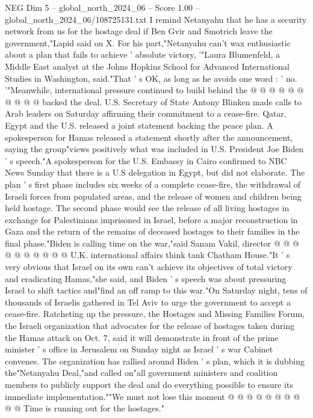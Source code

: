 \begin{textsample}{NEG Dim 5 – global\_north\_2024\_06 – Score 1.00 – global\_north\_2024\_06/108725131.txt}
I remind Netanyahu that he has a security network from us for the hostage deal if Ben Gvir and Smotrich leave the government,"Lapid said on X.
For his part,"Netanyahu can't wax enthusiastic about a plan that fails to achieve ' absolute victory, '"Laura Blumenfeld, a Middle East analyst at the Johns Hopkins School for Advanced International Studies in Washington, said."That ' s OK, as long as he avoids one word : ' no. '"Meanwhile, international pressure continued to build behind the @ @ @ @ @ @ @ @ @ @ backed the deal.
U.S.
Secretary of State Antony Blinken made calls to Arab leaders on Saturday affirming their commitment to a cease-fire.
Qatar, Egypt and the U.S. released a joint statement backing the peace plan.
A spokesperson for Hamas released a statement shortly after the announcement, saying the group"views positively what was included in U.S.
President Joe Biden ' s speech."A spokesperson for the U.S.
Embassy in Cairo confirmed to NBC News Sunday that there is a U.S delegation in Egypt, but did not elaborate.
The plan ' s first phase includes six weeks of a complete cease-fire, the withdrawal of Israeli forces from populated areas, and the release of women and children being held hostage.
The second phase would see the release of all living hostages in exchange for Palestinians imprisoned in Israel, before a major reconstruction in Gaza and the return of the remains of deceased hostages to their families in the final phase."Biden is calling time on the war,"said Sanam Vakil, director @ @ @ @ @ @ @ @ @ @ U.K. international affairs think tank Chatham House."It ' s very obvious that Israel on its own can't achieve its objectives of total victory and eradicating Hamas,"she said, and Biden ' s speech was about pressuring Israel to shift tactics and"find an off ramp to this war."On Saturday night, tens of thousands of Israelis gathered in Tel Aviv to urge the government to accept a cease-fire.
Ratcheting up the pressure, the Hostages and Missing Families Forum, the Israeli organization that advocates for the release of hostages taken during the Hamas attack on Oct. 7, said it will demonstrate in front of the prime minister ' s office in Jerusalem on Sunday night as Israel ' s war Cabinet convenes.
The organization has rallied around Biden ' s plan, which it is dubbing the"Netanyahu Deal,"and called on"all government ministers and coalition members to publicly support the deal and do everything possible to ensure its immediate implementation.""We must not lose this moment @ @ @ @ @ @ @ @ @ @ Time is running out for the hostages."

\end{textsample}
